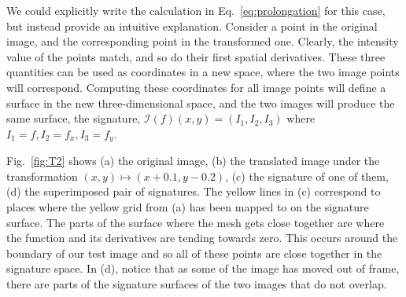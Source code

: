 \documentclass[review,onefignum,onetabnum]{siamonline190516}
\begin{document}
We could explicitly write the calculation in Eq.~\ref{eq:prolongation} for
this case, but instead provide an intuitive explanation. Consider a point
in the original image, and the corresponding point in the transformed one.
Clearly, the intensity value of the points match, and so do their first
spatial derivatives. These three quantities can be used as coordinates in a
new space, where the two image points will correspond. Computing these
coordinates for all image points will define a surface in the new
three-dimensional space, and the two images will produce the same surface,
the signature, $\mathcal{I}(f)(x, y) = \left(I_1, I_2,
I_3\right)$ where $I_1 = f, I_2 = f_x, I_3 = f_y$.

Fig.~\ref{fig:T2} shows (a) the original image, (b) the translated image
under the transformation $(x,y) \mapsto (x + 0.1, y - 0.2)$, (c) the
signature of one of them, (d) the superimposed pair of signatures. The
yellow lines in (c) correspond to places where the yellow grid from (a) has been
mapped to on the signature surface. The parts of the surface where the mesh
gets close together are where the function and its derivatives are tending
towards zero. This occurs around the boundary of our test image and so all
of these points are close together in the signature space. In (d), notice
that as some of the image has moved out of frame, there are parts of the
signature surfaces of the two images that do not overlap.
\end{document}
